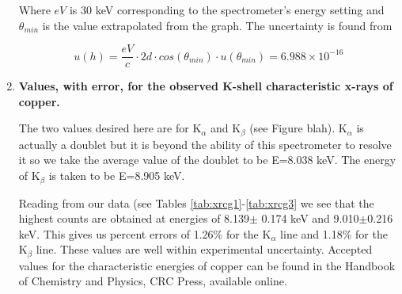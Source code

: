 \documentclass[justified]{tufte-book}
\begin{document}
\begin{enumerate}
\noindent Where $eV$ is 30 keV corresponding to the spectrometer's energy setting and $\theta_{min}$ is the value extrapolated from the graph. The uncertainty is found from

\begin{equation}
u(h)=\dfrac{eV}{c}\cdot 2d\cdot cos(\theta_{min})\cdot u(\theta_{min})=6.988\times10^{-16}
\label{equ:twcg4}
\end{equation}

\item {\bf Values, with error, for the observed K-shell characteristic x-rays of copper.}\newline

The two values desired here are for K$_{\alpha}$ and K$_{\beta}$ (see Figure blah). K$_{\alpha}$ is actually a doublet but it is beyond the ability of this spectrometer to resolve it so we take the average value of the doublet to be E=8.038 keV. The energy of K$_{\beta}$ is taken to be E=8.905 keV. 

Reading from our data (see Tables \ref{tab:xrcg1}-\ref{tab:xrcg3} we see that the highest counts are obtained at energies of 8.139$\pm$ 0.174 keV and 9.010$\pm$0.216 keV. This gives us percent errors of 1.26\% for the K$_{\alpha}$ line and 1.18\% for the K$_{\beta}$ line. These values are well within experimental uncertainty. Accepted values for the characteristic energies of copper can be found in the Handbook of Chemistry and Physics, CRC Press, available online.


\end{enumerate}
\end{document}
